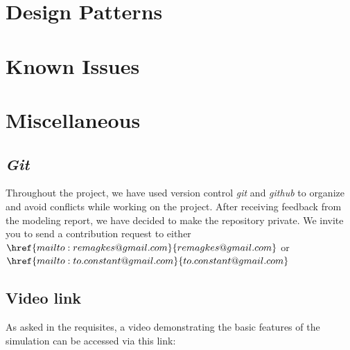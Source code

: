 \documentclass[11pt]{article}
\begin{document}
\section{Design Patterns}
\section{Known Issues}
\section{Miscellaneous}
\subsection{\textit{Git}}
Throughout the project, we have used version control \textit{git} and \textit{github} to organize and avoid conflicts while working on the project. After receiving feedback from the modeling report, we have decided to make the repository private. We invite you to send a contribution request to either $\href{mailto:remagkes@gmail.com}{remagkes@gmail.com} $ or $\href{mailto:to.constant@gmail.com}{to.constant@gmail.com}$
\subsection{Video link}
As asked in the requisites, a video demonstrating the basic features of the simulation can be accessed via this link: 
\end{document}
